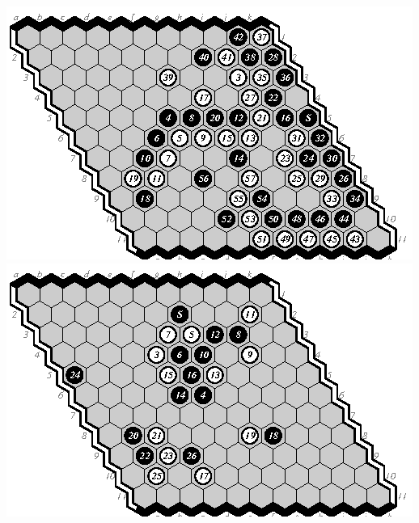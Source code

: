 \documentclass{icga}
\begin{document}
\includegraphics[scale=1.3]{5e-d.swap.eps}\hspace*{-1cm}\includegraphics[scale=1.3]{6d-m.eps}
\end{document}
